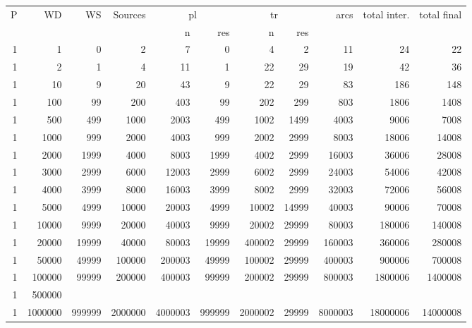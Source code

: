 \begin{tabular}{rrrr||rr|rr|r|r|r}
  P & WD & WS & Sources & \multicolumn{2}{c|}{pl} & \multicolumn{2}{c|}{tr} &
  arcs & total inter. & total final \\
    & & & & n & res & n & res & & & \\
  \hline
  1 & 1    & 0   & 2    & 7    & 0   & 4    & 2    & 11   & 24    & 22 \\
  1 & 2    & 1   & 4    & 11   & 1   & 22   & 29   & 19   & 42    & 36 \\
  1 & 10   & 9   & 20   & 43   & 9   & 22   & 29   & 83   & 186   & 148 \\
  1 & 100  & 99  & 200  & 403  & 99  & 202  & 299  & 803  & 1806  & 1408 \\
  1 & 500  & 499 & 1000 & 2003 & 499 & 1002 & 1499 & 4003 & 9006  & 7008 \\
  1 & 1000 & 999 & 2000 & 4003 & 999 & 2002 & 2999 & 8003 & 18006 & 14008 \\
  1 & 2000 & 1999 & 4000 & 8003 & 1999 & 4002 & 2999 & 16003 & 36006 & 28008 \\
  1 & 3000 & 2999 & 6000 & 12003 & 2999 & 6002 & 2999 & 24003 & 54006 & 42008 \\
  1 & 4000 & 3999 & 8000 & 16003 & 3999 & 8002 & 2999 & 32003 & 72006 & 56008 \\
  1 & 5000 & 4999 & 10000& 20003& 4999& 10002& 14999& 40003& 90006 & 70008 \\
  1 & 10000& 9999 & 20000& 40003& 9999& 20002& 29999& 80003& 180006& 140008 \\
  1 & 20000& 19999& 40000& 80003& 19999& 400002& 29999& 160003& 360006& 280008 \\
  1 & 50000& 49999 & 100000& 200003& 49999& 100002& 29999& 400003& 900006& 700008 \\
  1 & 100000& 99999& 200000& 400003& 99999& 200002& 29999& 800003& 1800006&
  1400008 \\
  1 & 500000&  & & & & & & & &  \\
  1 & 1000000& 999999& 2000000& 4000003& 999999& 2000002& 29999& 8000003&
  18000006& 14000008 \\
\end{tabular}
